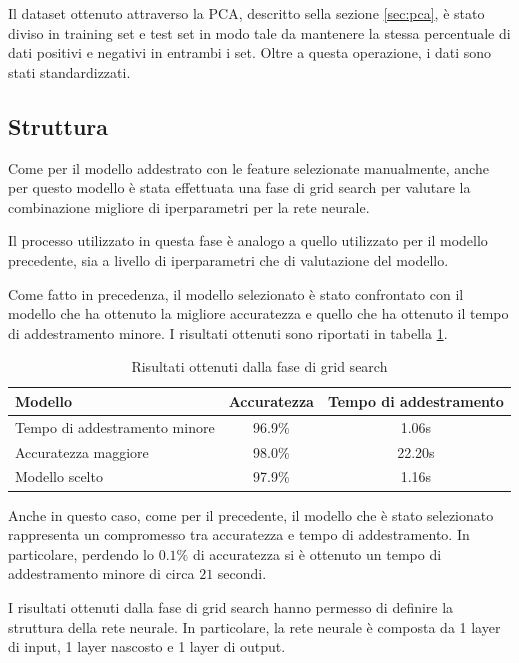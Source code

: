 Il dataset ottenuto attraverso la PCA, descritto sella sezione \ref{sec:pca}, è
stato diviso in training set e test set in modo tale da mantenere la stessa
percentuale di dati positivi e negativi in entrambi i set. Oltre a questa
operazione, i dati sono stati standardizzati.
\subsection{Struttura}
Come per il modello addestrato con le feature selezionate manualmente, anche per
questo modello è stata effettuata una fase di grid search per valutare la
combinazione migliore di iperparametri per la rete neurale.

Il processo utilizzato in questa fase è analogo a quello utilizzato per il modello
precedente, sia a livello di iperparametri che di valutazione del modello.

Come fatto in precedenza, il modello selezionato è stato confrontato con il modello
che ha ottenuto la migliore accuratezza e quello che ha ottenuto il tempo di
addestramento minore. I risultati ottenuti sono riportati in tabella \ref{tab:ris-grid-search-pca}.

\begin{table}[ht]
    \centering
    \begin{tabular}{@{}lcc@{}}
        \toprule
        \rowcolor[HTML]{EFEFEF}
        \textbf{Modello}              & \textbf{Accuratezza} & \textbf{Tempo di addestramento} \\ \midrule
        Tempo di addestramento minore & 96.9\%               & 1.06s                           \\
        Accuratezza maggiore          & 98.0\%               & 22.20s                          \\
        Modello scelto                & 97.9\%               & 1.16s                           \\ \bottomrule
    \end{tabular}
    \caption{Risultati ottenuti dalla fase di grid search}
    \label{tab:ris-grid-search-pca}
\end{table}
Anche in questo caso, come per il precedente, il modello che è stato selezionato
rappresenta un compromesso tra accuratezza e tempo di addestramento. In particolare,
perdendo lo $0.1\%$ di accuratezza si è ottenuto un tempo di addestramento minore
di circa $21$ secondi.


I risultati ottenuti dalla fase di grid search hanno permesso di definire la
struttura della rete neurale. In particolare, la rete neurale è composta da 1
layer di input, 1 layer nascosto e 1 layer di output.

